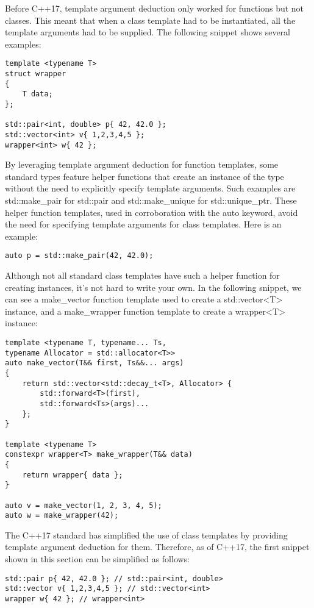 Before C++17, template argument deduction only worked for functions but not classes. This meant that when a class template had to be instantiated, all the template arguments had to be supplied. The following snippet shows several examples:

\begin{lstlisting}[style=styleCXX]
template <typename T>
struct wrapper
{
	T data;
};

std::pair<int, double> p{ 42, 42.0 };
std::vector<int> v{ 1,2,3,4,5 };
wrapper<int> w{ 42 };
\end{lstlisting}

By leveraging template argument deduction for function templates, some standard types feature helper functions that create an instance of the type without the need to explicitly specify template arguments. Such examples are std::make\_pair for std::pair and std::make\_unique for std::unique\_ptr. These helper function templates, used in corroboration with the auto keyword, avoid the need for specifying template arguments for class templates. Here is an example:

\begin{lstlisting}[style=styleCXX]
auto p = std::make_pair(42, 42.0);
\end{lstlisting}

Although not all standard class templates have such a helper function for creating instances, it’s not hard to write your own. In the following snippet, we can see a make\_vector function template used to create a std::vector<T> instance, and a make\_wrapper function template to create a wrapper<T> instance:

\begin{lstlisting}[style=styleCXX]
template <typename T, typename... Ts,
typename Allocator = std::allocator<T>>
auto make_vector(T&& first, Ts&&... args)
{
	return std::vector<std::decay_t<T>, Allocator> {
		std::forward<T>(first),
		std::forward<Ts>(args)...
	};
}

template <typename T>
constexpr wrapper<T> make_wrapper(T&& data)
{
	return wrapper{ data };
}

auto v = make_vector(1, 2, 3, 4, 5);
auto w = make_wrapper(42);
\end{lstlisting}

The C++17 standard has simplified the use of class templates by providing template argument deduction for them. Therefore, as of C++17, the first snippet shown in this section can be simplified as follows:

\begin{lstlisting}[style=styleCXX]
std::pair p{ 42, 42.0 }; // std::pair<int, double>
std::vector v{ 1,2,3,4,5 }; // std::vector<int>
wrapper w{ 42 }; // wrapper<int>
\end{lstlisting}

